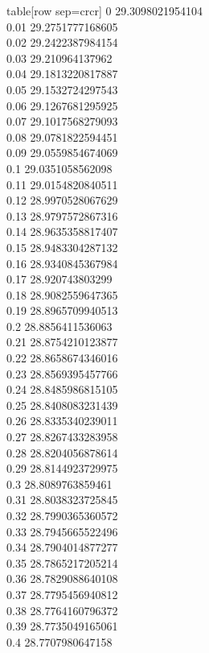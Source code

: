   table[row sep=crcr]{%
0	29.3098021954104\\
0.01	29.2751777168605\\
0.02	29.2422387984154\\
0.03	29.210964137962\\
0.04	29.1813220817887\\
0.05	29.1532724297543\\
0.06	29.1267681295925\\
0.07	29.1017568279093\\
0.08	29.0781822594451\\
0.09	29.0559854674069\\
0.1	29.0351058562098\\
0.11	29.0154820840511\\
0.12	28.9970528067629\\
0.13	28.9797572867316\\
0.14	28.9635358817407\\
0.15	28.9483304287132\\
0.16	28.9340845367984\\
0.17	28.920743803299\\
0.18	28.9082559647365\\
0.19	28.8965709940513\\
0.2	28.8856411536063\\
0.21	28.8754210123877\\
0.22	28.8658674346016\\
0.23	28.8569395457766\\
0.24	28.8485986815105\\
0.25	28.8408083231439\\
0.26	28.8335340239011\\
0.27	28.8267433283958\\
0.28	28.8204056878614\\
0.29	28.8144923729975\\
0.3	28.8089763859461\\
0.31	28.8038323725845\\
0.32	28.7990365360572\\
0.33	28.7945665522496\\
0.34	28.7904014877277\\
0.35	28.7865217205214\\
0.36	28.7829088640108\\
0.37	28.7795456940812\\
0.38	28.7764160796372\\
0.39	28.7735049165061\\
0.4	28.7707980647158\\
}
